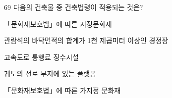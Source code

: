 \begin{question}{69}
다음의 건축물 중 건축법령이 적용되는 것은?
\begin{choices}
  \item 「문화재보호법」에 따른 지정문화재
  \item 관람석의 바닥면적의 합계가 1천 제곱미터 이상인 경정장
  \item 고속도로 통행료 징수시설
  \item 궤도의 선로 부지에 있는 플랫폼
  \item 「문화재보호법」에 따른 가지정 문화재
\end{choices}
\end{question}
